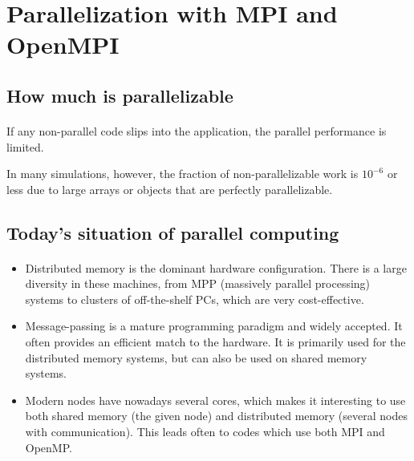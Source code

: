 \documentclass[%
oneside,                 %
final,                   %
10pt]{article}
\begin{document}

\newcommand{\exercisesection}[1]{\subsection*{#1}}



\section*{Parallelization with MPI and OpenMPI}

\subsection*{How much is parallelizable}

\paragraph{}
If any non-parallel code slips into the
application, the parallel
performance is limited. 

In many simulations, however, the fraction of non-parallelizable work
is $10^{-6}$ or less due to large arrays or objects that are perfectly parallelizable.



\subsection*{Today's situation of parallel computing}

\paragraph{}

\begin{itemize}
\item Distributed memory is the dominant hardware configuration. There is a large diversity in these machines, from  MPP (massively parallel processing) systems to clusters of off-the-shelf PCs, which are very cost-effective.

\item Message-passing is a mature programming paradigm and widely accepted. It often provides an efficient match to the hardware. It is primarily used for the distributed memory systems, but can also be used on shared memory systems.

\item Modern nodes have nowadays several cores, which makes it interesting to use both shared memory (the given node) and distributed memory (several nodes with communication). This leads often to codes which use both MPI and OpenMP.
\end{itemize}
\end{document}
